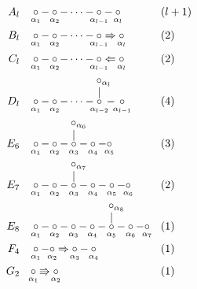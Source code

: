 \documentclass{article}
\begin{document}
\begin{align*}
A_l &&& \underset{\mathclap{\alpha_1}}{\circ} - \underset{\mathclap{\alpha_2}}{\circ} - \dotsb - \underset{\mathclap{\alpha_{l-1}}}{\circ} - \underset{\mathclap{\alpha_l}}{\circ} && (l+1) \\
%
B_l &&& \underset{\mathclap{\alpha_1}}{\circ} - \underset{\mathclap{\alpha_2}}{\circ} - \dotsb - \underset{\mathclap{\alpha_{l-1}}}{\circ} \Rightarrow \underset{\mathclap{\alpha_l}}{\circ} && (2) \\
%
C_l &&& \underset{\mathclap{\alpha_1}}{\circ} - \underset{\mathclap{\alpha_2}}{\circ} - \dotsb - \underset{\mathclap{\alpha_{l-1}}}{\circ} \Leftarrow \underset{\mathclap{\alpha_l}}{\circ} && (2) \\
%
D_l &&& \underset{\mathclap{\alpha_1}}{\circ} - \underset{\mathclap{\alpha_2}}{\circ} - \dotsb - \underset{\mathclap{\alpha_{l-2}}}{\overset{\overset{\textstyle\circ_{\mathrlap{\alpha_l}}}{\textstyle\vert}}{\circ}} \,-\, \underset{\mathclap{\alpha_{l-1}}}{\circ} && (4) \\
%
E_6 &&& \underset{\mathclap{\alpha_1}}{\circ} - \underset{\mathclap{\alpha_2}}{\circ} - \underset{\mathclap{\alpha_3}}{\overset{\overset{\textstyle\circ_{\mathrlap{\alpha_6}}}{\textstyle\vert}}{\circ}} - \underset{\mathclap{\alpha_4}}{\circ} - \underset{\mathclap{\alpha_5}}{\circ} && (3) \\
%
E_7 &&& \underset{\mathclap{\alpha_1}}{\circ} - \underset{\mathclap{\alpha_2}}{\circ} - \underset{\mathclap{\alpha_3}}{\overset{\overset{\textstyle\circ_{\mathrlap{\alpha_7}}}{\textstyle\vert}}{\circ}} - \underset{\mathclap{\alpha_4}}{\circ} - \underset{\mathclap{\alpha_5}}{\circ} - \underset{\mathclap{\alpha_6}}{\circ} && (2) \\
%
E_8 &&& \underset{\mathclap{\alpha_1}}{\circ} - \underset{\mathclap{\alpha_2}}{\circ} - \underset{\mathclap{\alpha_3}}{\circ} - \underset{\mathclap{\alpha_4}}{\circ} - \underset{\mathclap{\alpha_5}}{\overset{\overset{\textstyle\circ_{\mathrlap{\alpha_8}}}{\textstyle\vert}}{\circ}} - \underset{\mathclap{\alpha_6}}{\circ} - \underset{\mathclap{\alpha_7}}{\circ} && (1) \\
%
F_4 &&& \underset{\mathclap{\alpha_1}}{\circ} - \underset{\mathclap{\alpha_2}}{\circ} \Rightarrow \underset{\mathclap{\alpha_3}}{\circ} - \underset{\mathclap{\alpha_4}}{\circ} && (1) \\
%
G_2 &&& \underset{\mathclap{\alpha_1}}{\circ} \Rrightarrow \underset{\mathclap{\alpha_2}}{\circ} && (1)
\end{align*}
\end{document}
